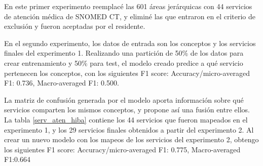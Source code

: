 En este primer experimento reemplacé las 601 áreas jerárquicas con 44 servicios de atención médica de SNOMED CT, y eliminé las que entraron en el criterio de exclusión y fueron aceptadas por el residente.

En el segundo experimento, los datos de entrada son los conceptos y los servicios finales del experimento 1. Realizando una partición de 50\% de los datos para crear entrenamiento y 50\% para test, el modelo creado predice a qué servicio pertenecen los conceptos, con los siguientes F1 score:  Accuracy/micro-averaged F1: 0.736, Macro-averaged F1: 0.500.

La matriz de confusión generada por el modelo aporta información sobre qué servicios comparten los mismos conceptos, y propone así una fusión entre ellos. La tabla \ref{serv_aten_hiba} contiene los 44 servicios que fueron mapeados en el experimento 1, y los 29 servicios finales obtenidos a partir del experimento 2. Al crear un nuevo modelo con los mapeos de los servicios del experimento 2, obtengo los siguientes F1 score: Accuracy/micro-averaged F1: 0.775, Macro-averaged F1:0.664

